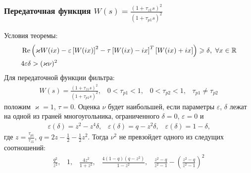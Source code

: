 \documentclass{beamer}
\begin{document}
\begin{frame}
\frametitle{Передаточная функция $W(s) = \frac{(1+\tau_{z1}s)^2}{(1+\tau_{p1}s)^2}$}
Условия теоремы:\vspace{-2mm}
 \begin{align*}
&\operatorname{Re}\left( \varkappa W(ix)- \varepsilon\left[W(ix)\right]^2-\tau\left[ W(ix)-ix \right]^T\left[W(ix)+ix \right]\right) \geqslant \delta \text{,}\enskip\forall x \in \mathbb{R}\\
&4\varepsilon\delta > (\varkappa\nu)^2
\end{align*}
Для передаточной функции фильтра:\vspace{-2mm}
 \begin{align}\label{filter2}
W(s) = \frac{(1+\tau_{z1}s)^2}{(1+\tau_{p1}s)^2}\text{,} \quad0 < \tau_{p1} < 1 \text{,} \quad 0 < \tau_{p2} <1 \text{,} \quad \tau_{p1} \neq \tau_{p2}
 \end{align}
положим $\varkappa = 1$, $\tau = 0$. Оценка $\nu$ будет наибольшей, если параметры $\varepsilon$, $\delta$ лежат на одной из граней многоугольника, ограниченного $\delta = 0$, $\varepsilon = 0$ и \vspace{-2mm}
 \begin{equation*}
\begin{aligned}
\varepsilon(\delta)=z^2 - z^4\delta \text{,} \quad \varepsilon(\delta)=q - z^2\delta \text{,}
\quad \varepsilon(\delta)=1 - \delta \text{,}
\end{aligned}
\end{equation*}
где $z = \frac{\tau_{p1}}{\tau_{z1}}$, $q = 2z - \frac{1}{2} - \frac{1}{2}z^2$. 
Тогда $\nu^2$ не превзойдет одного из следущих соотношений:
\vspace{-2mm}
 \begin{equation}
\begin{aligned}
\frac{q^2}{z^2}\text{,} \quad 1 \text{,} \quad \frac{4z^2}{1+z^2} \text{,} \quad \frac{4(1-q)(q-z^2)}{1-z^2} \text{,} \quad \frac{z^2-q}{z^2-1} - \left(\frac{z^2-q}{z^2-1}\right)^2
\end{aligned}
\end{equation}
\end{frame}

\end{document}
